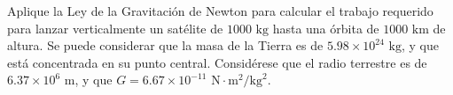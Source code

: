 \item Aplique la Ley de la Gravitación de Newton para calcular el trabajo requerido para lanzar verticalmente un satélite de $1000 \text{ kg}$ hasta una órbita de $1000 \text{ km}$ de altura. Se puede considerar que la masa de la Tierra es de $5.98 \times 10^{24} \text{ kg}$, y que está concentrada en su punto central. Considérese que el radio terrestre es de $6.37 \times 10^6 \text{ m}$, y que $G = 6.67 \times 10^{-11} \text{ N}\cdot\text{m}^2/\text{kg}^2$.
